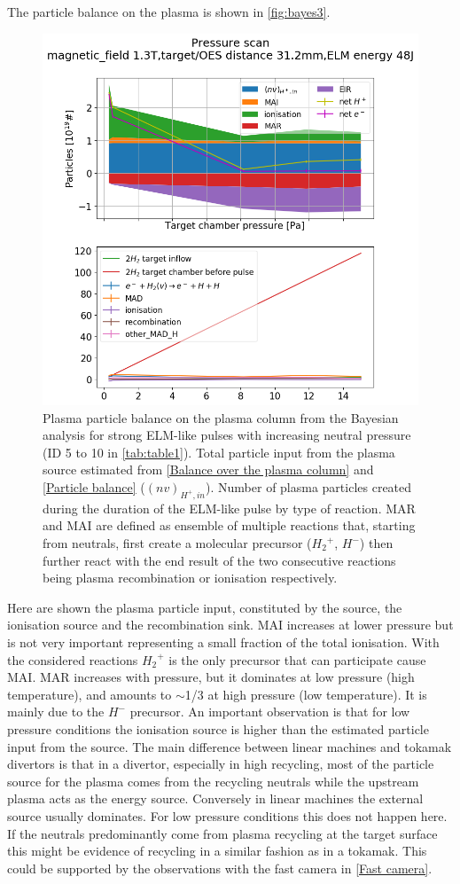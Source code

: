 The particle balance on the plasma is shown in \autoref{fig:bayes3}.
\begin{figure}
        \centering
    	\includegraphics[width=0.7\linewidth,trim={30 260 60 60},clip]{Chapters/chapter3/figs/bayesian_strong_6.png}
	\caption{Plasma particle balance on the plasma column from the Bayesian analysis for strong ELM-like pulses with increasing neutral pressure (ID 5 to 10 in \autoref{tab:table1}). Total particle input from the plasma source estimated from \autoref{Balance over the plasma column} and \ref{Particle balance} ($(nv)_{H^+,in}$). Number of plasma particles created during the duration of the ELM-like pulse by type of reaction. MAR and MAI are defined as ensemble of multiple reactions that, starting from neutrals, first create a molecular precursor (${H_2}^+$, $H^-$) then further react with the end result of the two consecutive reactions being plasma recombination or ionisation respectively.\cite{Verhaegh2020}}
	\label{fig:bayes3}
\end{figure}
Here are shown the plasma particle input, constituted by the source, the ionisation source and the recombination sink. MAI increases at lower pressure but is not very important representing a small fraction of the total ionisation. With the considered reactions ${H_2}^+$ is the only precursor that can participate cause MAI. MAR increases with pressure, but it dominates at low pressure (high temperature), and amounts to $\sim$1/3 at high pressure (low temperature). It is mainly due to the $H^-$ precursor. An important observation is that for low pressure conditions the ionisation source is higher than the estimated particle input from the source. The main difference between linear machines and tokamak divertors is that in a divertor, especially in high recycling, most of the particle source for the plasma comes from the recycling neutrals while the upstream plasma acts as the energy source. Conversely in linear machines the external source usually dominates. For low pressure conditions this does not happen here. If the neutrals predominantly come from plasma recycling at the target surface this might be evidence of recycling in a similar fashion as in a tokamak. This could be supported by the observations with the fast camera in \autoref{Fast camera}.
